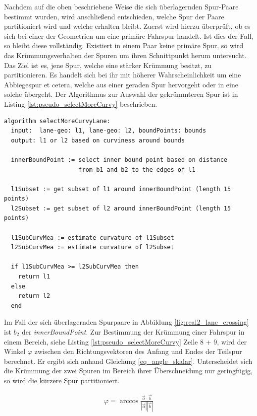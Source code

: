 Nachdem auf die oben beschriebene Weise die sich überlagernden Spur-Paare bestimmt wurden, wird anschließend
entschieden, welche Spur der Paare partitioniert wird und welche erhalten bleibt. Zuerst wird hierzu
überprüft, ob es sich bei einer der Geometrien um eine primäre Fahrspur handelt. Ist dies der Fall, so
bleibt diese vollständig. Existiert in einem Paar keine primäre Spur, so wird das Krümmungsverhalten der Spuren
um ihren Schnittpunkt herum untersucht. Das Ziel ist es, jene Spur, welche eine stärker Krümmung besitzt,
zu partitionieren. Es handelt sich bei ihr mit höherer Wahrscheinlichkeit um eine Abbiegespur et cetera,
welche aus einer geraden Spur hervorgeht oder in eine solche übergeht. Der Algorithmus zur Auswahl
der gekrümmteren Spur ist in Listing \ref{lst:pseudo_selectMoreCurvy} beschrieben.
\begin{lstlisting}[caption=Pseudocode Auswahl gekrümmtr Fahrspur, language=Pseudo, label=lst:pseudo_selectMoreCurvy]
algorithm selectMoreCurvyLane:
  input:  lane-geo: l1, lane-geo: l2, boundPoints: bounds
  output: l1 or l2 based on curviness around bounds

  innerBoundPoint := select inner bound point based on distance
                     from b1 and b2 to the edges of l1

  l1Subset := get subset of l1 around innerBoundPoint (length 15 points)
  l2Subset := get subset of l2 around innerBoundPoint (length 15 points)

  l1SubCurvMea := estimate curvature of l1Subset 
  l2SubCurvMea := estimate curvature of l2Subset 

  if l1SubCurvMea >= l2SubCurvMea then
    return l1
  else
    return l2
  end
\end{lstlisting}

Im Fall der sich überlagernden Spurpaare in Abbildung \ref{fig:real2_lane_crossing} ist $b_2$ der \textit{innerBoundPoint}.
Zur Bestimmung der Krümmung einer Fahrspur in einem Bereich, siehe Listing \ref{lst:pseudo_selectMoreCurvy}
Zeile 8 + 9, wird der Winkel $\varphi$ zwischen den Richtungsvektoren des Anfang und Endes der Teilspur berechnet.
Er ergibt sich anhand Gleichung \ref{eq_angle_skalar}.
Unterscheidet sich die Krümmung der zwei Spuren im Bereich ihrer Überschneidung nur geringfügig, so wird
die kürzere Spur partitioniert. 

\begin{ceqn}
\begin{align}
\label{eq_angle_skalar}
    \varphi=\arccos \frac{\vec a \cdot \vec b}{|\vec a| |\vec b|}
\end{align}
\end{ceqn}

